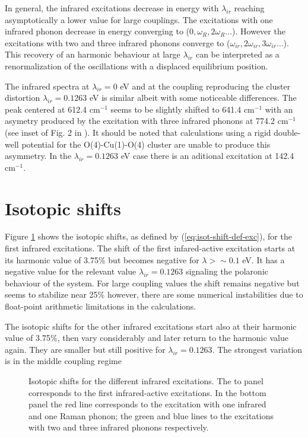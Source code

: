 In general, the infrared excitations decrease in energy with $\lambda_{ir}$ reaching asymptotically a lower value for large couplings.
The excitations with one infrared phonon decrease in energy converging to ($0,\omega_R,2\omega_R\ldots$).
However the excitations with two and three infrared phonons converge to ($\omega_{ir},2\omega_{ir},3\omega_{ir}\ldots$).
This recovery of an harmonic behaviour at large $\lambda_{ir}$ can be interpreted as a renormalization of the oscillations with a displaced equilibrium position.

The infrared spectra at $\lambda_{ir}=0$ eV and at the coupling reproducing the cluster distortion $\lambda_{ir}=0.1263$ eV is similar albeit with some noticeable differences.
The peak centered at 612.4 cm$^{-1}$ seems to be slightly shifted to 641.4 cm$^{-1}$ with an asymetry produced by the excitation with three infrared phonons at 774.2 cm$^{-1}$ (see inset of Fig. 2 in \cite{MustredeLeon1992}).
It should be noted that calculations using a rigid double-well potential for the O(4)-Cu(1)-O(4) cluster are unable to produce this asymmetry.
In the $\lambda_{ir}=0.1263$ eV case there is an aditional excitation at 142.4 cm$^{-1}$.

\section{Isotopic shifts}
\label{sec:irIsotopicShifts}

Figure \ref{fig:irIsot} shows the isotopic shifts, as defined by (\ref{eq:isot-shift-def-exc}), for the first infrared excitations.
The shift of the first infared-active excitation starts at its harmonic value of 3.75\% but becomes negative for $\lambda > \sim 0.1$ eV.
It has a negative value for the relevant value $\lambda_{ir}=0.1263$ signaling the polaronic behaviour of the system.
For large coupling values the shift remains negative but seems to stabilize near 25\% however, there are some numerical instabilities due to float-point arithmetic limitations in the calculations.

The isotopic shifts for the other infrared excitations start also at their harmonic value of 3.75\%, then vary considerably and later return to the harmonic value again.
They are smaller but still positive for $\lambda_{ir}=0.1263$.
The strongest variation is in the middle coupling regime
%
\begin{figure}[ht]
  \centering
  
  \caption[Isotopic shifts for the different infrared excitations.]
  {Isotopic shifts for the different infrared excitations.
  The to panel corresponds to the first infrared-active excitations.
  In the bottom panel the red line corresponds to the excitation with one infrared and one Raman phonon; the green and blue lines to the excitations with two and three infrared phonons respectively.}
  \label{fig:irIsot}
\end{figure}


